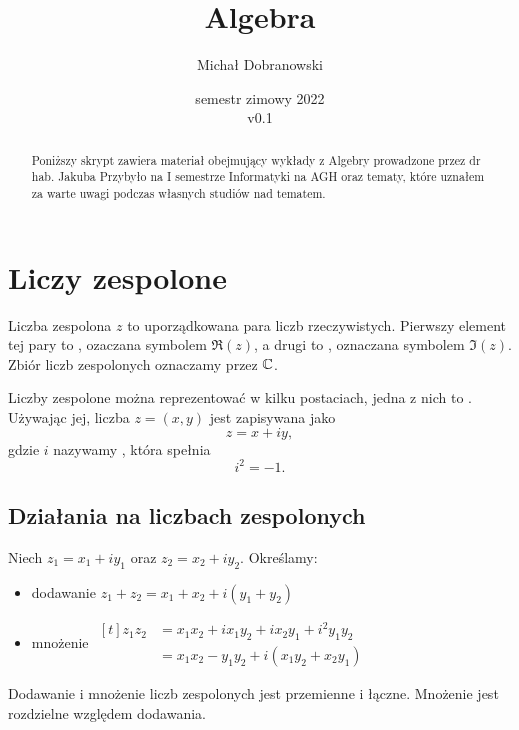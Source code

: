 \documentclass[11pt]{scrartcl}
\title{Algebra}
\author{Michał Dobranowski}
\date{semestr zimowy 2022 \\ v0.1}
\begin{document}
    \maketitle
    \begin{abstract}
        Poniższy skrypt zawiera materiał obejmujący wykłady z Algebry prowadzone przez dr hab. Jakuba Przybyło na I semestrze Informatyki na AGH oraz tematy, które uznałem za warte uwagi podczas własnych studiów nad tematem.
    \end{abstract}
    \tableofcontents
    \eject

    \section{Liczy zespolone}
    \begin{definition}
        Liczba zespolona $z$ to uporządkowana para liczb rzeczywistych. Pierwszy element tej pary to , ozaczana symbolem $\Re(z)$, a drugi to , oznaczana symbolem $\Im(z)$. Zbiór liczb zespolonych oznaczamy przez $\mathbb C$.
    \end{definition}

    Liczby zespolone można reprezentować w kilku postaciach, jedna z nich to . Używając jej, liczba $z = (x, y)$ jest zapisywana jako
    $$ z = x + iy, $$
    gdzie $i$ nazywamy , która spełnia
    $$ i^2 = -1. $$

    \subsection{Działania na liczbach zespolonych}
    Niech $z_1 = x_1 + iy_1$ oraz $z_2 = x_2 + iy_2$. Określamy:
    \begin{itemize}
        \item dodawanie $z_1 + z_2 = x_1 + x_2 + i(y_1 + y_2)$
        \item mnożenie $\begin{aligned}[t] z_1z_2 &= x_1x_2 + ix_1y_2 + ix_2y_1 + i^2y_1y_2 \\ &= x_1x_2 - y_1y_2 + i(x_1y_2 + x_2y_1)\end{aligned}$
    \end{itemize}

    \begin{corollary}
        Dodawanie i mnożenie liczb zespolonych jest przemienne i łączne. Mnożenie jest rozdzielne względem dodawania.
    \end{corollary}
\end{document}
